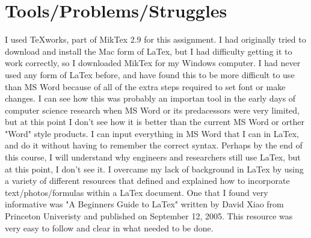 \documentclass[12pt]{article}
\begin{document}
\section*{Tools/Problems/Struggles}
I used TeXworks, part of MikTex 2.9 for this assignment.  I had originally tried to download and install the Mac form of LaTex, but I had difficulty getting it to work correctly, so I downloaded MikTex for my Windows computer.  I had never used any form of LaTex before, and have found this to be more difficult to use than MS Word because of all of the extra steps required to set font or make changes.  I can see how this was probably an importan tool in the early days of computer science research when MS Word or its predacessors were very limited, but at this point I don't see how it is better than the current MS Word or orther "Word" style products. I can input everything in MS Word that I can in LaTex, and do it without having to remember the correct syntax. Perhaps by the end of this course, I will understand why engineers and researchers still use LaTex, but at this point, I don't see it. I overcame my lack of background in LaTex by using a variety of different resources that defined and explained how to incorporate text/photos/formulas within a LaTex document. One that I found very informative was "A Beginners Guide to LaTex" written by David Xiao from Princeton Univeristy and published on September 12, 2005. This resource was very easy to follow and clear in what needed to be done.  
\end{document}
